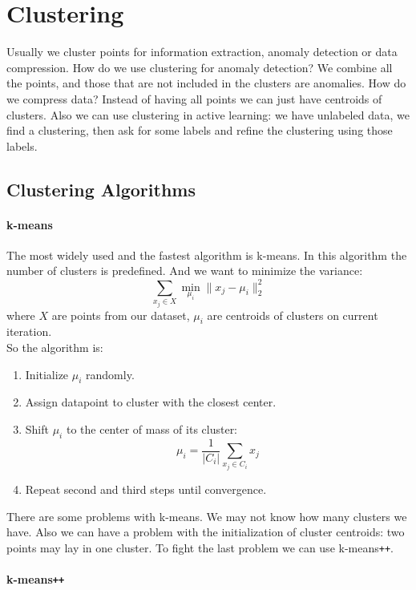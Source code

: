 \chapter{Clustering}

{\sf Usually we cluster points for information extraction, anomaly detection or data compression. How do we use clustering for anomaly detection? We combine all the points, and those that are not included in the clusters are anomalies. How do we compress data? Instead of having all points we can just have centroids of clusters. Also we can use clustering in active learning: we have unlabeled data, we find a clustering, then ask for some labels and refine the clustering using those labels.}

\section{Clustering Algorithms}
\vspace{-0.6cm}
\subsubsection*{k-means}

The most widely used and the fastest algorithm is k-means. In this algorithm the number of clusters is predefined. And we want to minimize the variance:
$$\sum\limits_{x_j\in X}\min\limits_{\mu_i}\|x_j-\mu_i\|_2^2$$
where $X$ are points from our dataset, $\mu_i$ are centroids of clusters on current iteration. \\
So the algorithm is:
\begin{enumerate}
	\item Initialize $\mu_i$ randomly.
	\item Assign datapoint to cluster with the closest center.
	\item Shift $\mu_i$ to the center of mass of its cluster: $$\mu_i=\frac{1}{|C_i|}\sum\limits_{x_j\in C_i}x_j$$
	\item Repeat second and third steps until convergence.
\end{enumerate} 
There are some problems with k-means. We may not know how many clusters we have. Also we can have a problem with the initialization of cluster centroids: two points may lay in one cluster. To fight the last problem we can use k-means\texttt{++}.

\subsubsection*{k-means\texttt{++}}

